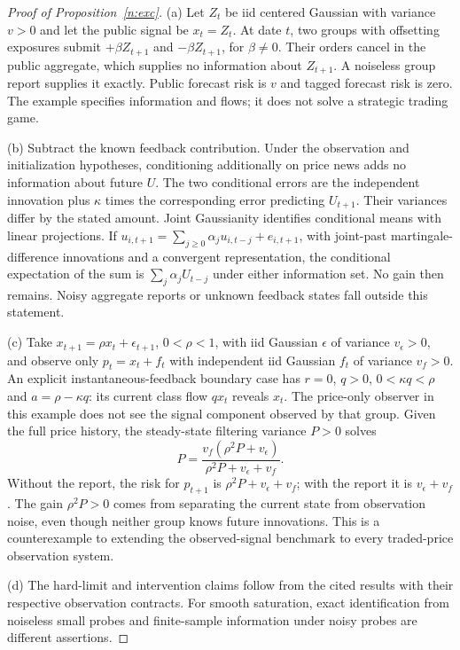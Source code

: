 \documentclass[12pt]{article}
\theoremstyle{definition}
\theoremstyle{remark}
\begin{document}
\begin{proof}[Proof of Proposition~\ref{n:exc}]
(a) Let $Z_t$ be iid centered Gaussian with variance $v>0$ and let the public signal be $x_t=Z_t$. At date $t$, two groups with offsetting exposures submit $+\beta Z_{t+1}$ and $-\beta Z_{t+1}$, for $\beta\ne0$. Their orders cancel in the public aggregate, which supplies no information about $Z_{t+1}$. A noiseless group report supplies it exactly. Public forecast risk is $v$ and tagged forecast risk is zero. The example specifies information and flows; it does not solve a strategic trading game.

(b) Subtract the known feedback contribution. Under the observation and initialization hypotheses, conditioning additionally on price news adds no information about future $U$. The two conditional errors are the independent innovation plus $\kappa$ times the corresponding error predicting $U_{t+1}$. Their variances differ by the stated amount. Joint Gaussianity identifies conditional means with linear projections. If $u_{i,t+1}=\sum_{j\ge0}\alpha_j u_{i,t-j}+e_{i,t+1}$, with joint-past martingale-difference innovations and a convergent representation, the conditional expectation of the sum is $\sum_j\alpha_j U_{t-j}$ under either information set. No gain then remains. Noisy aggregate reports or unknown feedback states fall outside this statement.

(c) Take $x_{t+1}=\rho x_t+\epsilon_{t+1}$, $0<\rho<1$, with iid Gaussian $\epsilon$ of variance $v_\epsilon>0$, and observe only $p_t=x_t+f_t$ with independent iid Gaussian $f_t$ of variance $v_f>0$. An explicit instantaneous-feedback boundary case has $r=0$, $q>0$, $0<\kappa q<\rho$ and $a=\rho-\kappa q$: its current class flow $qx_t$ reveals $x_t$. The price-only observer in this example does not see the signal component observed by that group. Given the full price history, the steady-state filtering variance $P>0$ solves
\[
P=\frac{v_f(\rho^2P+v_\epsilon)}{\rho^2P+v_\epsilon+v_f}.
\]
Without the report, the risk for $p_{t+1}$ is $\rho^2P+v_\epsilon+v_f$; with the report it is $v_\epsilon+v_f$. The gain $\rho^2P>0$ comes from separating the current state from observation noise, even though neither group knows future innovations. This is a counterexample to extending the observed-signal benchmark to every traded-price observation system.

(d) The hard-limit and intervention claims follow from the cited results with their respective observation contracts. For smooth saturation, exact identification from noiseless small probes and finite-sample information under noisy probes are different assertions.
\end{proof}
\end{document}
